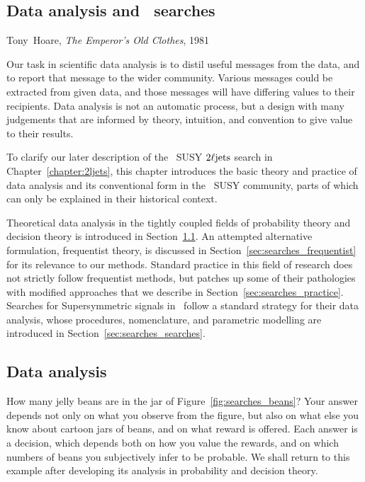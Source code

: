 \begin{singlespacing}
\chapter{Data analysis and \atlas\ searches}
\label{chapter:searches}
\begin{epigraphs}
%
{Tony~Hoare,
\textit{The Emperor’s Old Clothes},
1981~\cite{hoare2007emperor}}
\end{epigraphs}
\end{singlespacing}

Our task in scientific data analysis is to distil useful messages from the
data, and to report that message to the wider community.
Various messages could be extracted from given data,
and those messages will have differing values to their recipients.
Data analysis is not an automatic process, but a design with many judgements
that are informed by theory, intuition, and convention to give value to their
results.

To clarify our later description of the \atlas\ SUSY $2\ell\mathrm{jets}$ search in
Chapter~\ref{chapter:2ljets}, this chapter introduces the basic theory and
practice of data analysis and its conventional form in the \atlas\ SUSY
community, parts of which can only be explained in their historical context.

Theoretical data analysis in the tightly coupled fields of probability theory
and decision theory is introduced in Section~\ref{sec:searches_data_analysis}.
An attempted alternative formulation, frequentist theory, is discussed in
Section~\ref{sec:searches_frequentist} for its relevance to our methods.
Standard practice in this field of research does not strictly follow
frequentist methods, but patches up some of their pathologies with modified
approaches that we describe in Section~\ref{sec:searches_practice}.
Searches for Supersymmetric signals in \atlas\ follow a standard strategy for
their data analysis, whose procedures, nomenclature, and parametric modelling
are introduced in Section~\ref{sec:searches_searches}.


\section{Data analysis}
\label{sec:searches_data_analysis}
How many jelly beans are in the jar of Figure~\ref{fig:searches_beans}?
Your answer depends not only on what you observe from the figure, but also on
what else you know about cartoon jars of beans, and on what reward is offered.
Each answer is a decision, which depends both on how you value the rewards,
and on which numbers of beans you subjectively infer to be probable.
We shall return to this example after developing its analysis in probability
and decision theory.

